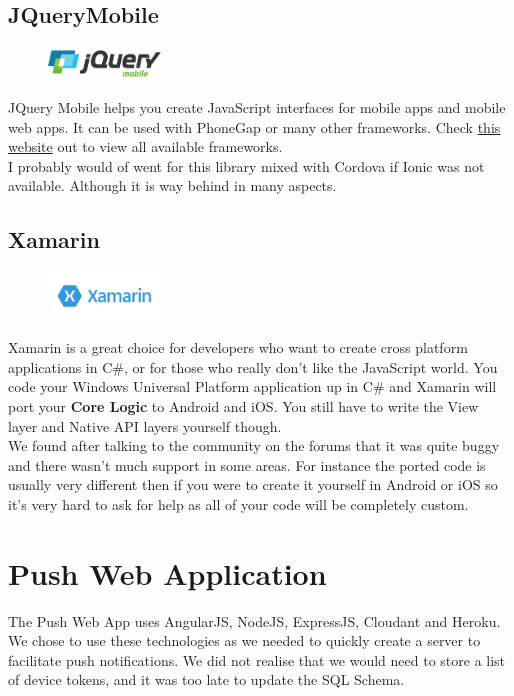 \subsection{JQueryMobile}
\begin{figure}
\includegraphics[width=3cm]{img/mobile-app/logos/jquery-mobile.png}
\end{figure} 
JQuery \cite{jquery_mobile} Mobile helps you create JavaScript interfaces for mobile apps and mobile web apps.
It can be used with PhoneGap or many other frameworks.
Check \href{http://jquerymobile.com/resources/}{this website} out to view all available frameworks.
\\
I probably would of went for this library mixed with Cordova if Ionic was not available.
Although it is way behind in many aspects.

\subsection{Xamarin}
\begin{figure}
\includegraphics[width=3cm]{img/mobile-app/logos/xamarin.png}
\end{figure} 
\cite{xamarin}
Xamarin is a great choice for developers who want to create cross platform applications in C\#, or for those who really don't like the JavaScript world.
You code your Windows Universal Platform application up in C\# and Xamarin will port your \textbf{Core Logic} to Android and iOS.
You still have to write the View layer and Native API layers yourself though.
\\

We found after talking to the community on the forums that it was quite buggy and there wasn't much support in some areas.
For instance the ported code is usually very different then if you were to create it yourself in Android or iOS so it's very hard to ask for help as all of your code will be completely custom.

  \section{Push Web Application}
The Push Web App uses AngularJS, NodeJS, ExpressJS, Cloudant and Heroku.
We chose to use these technologies as we needed to quickly create a server to facilitate push notifications.
We did not realise that we would need to store a list of device tokens, and it was too late to update the SQL Schema.

